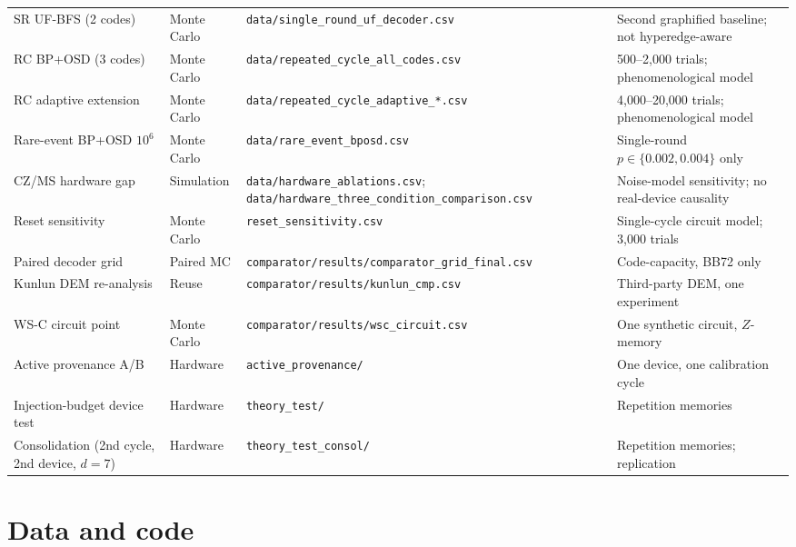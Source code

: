 \documentclass[11pt,a4paper]{article}
\begin{document}
\begin{table}[H]
\begin{tabularx}{\textwidth}{@{}p{3.1cm}p{1.7cm}X p{2.9cm}@{}}
SR UF-BFS (2 codes) & Monte Carlo & \texttt{data/single\_round\_uf\_decoder.csv} & Second graphified baseline; not hyperedge-aware \\
RC BP+OSD (3 codes) & Monte Carlo & \texttt{data/repeated\_cycle\_all\_codes.csv} & 500--2,000 trials; phenomenological model \\
RC adaptive extension & Monte Carlo & \texttt{data/repeated\_cycle\_adaptive\_*.csv} & 4,000--20,000 trials; phenomenological model \\
Rare-event BP+OSD $10^{6}$ & Monte Carlo & \texttt{data/rare\_event\_bposd.csv} & Single-round $p\in\{0.002,0.004\}$ only \\
CZ/MS hardware gap & Simulation & \texttt{data/hardware\_ablations.csv}; \texttt{data/hardware\_three\_condition\_comparison.csv} & Noise-model sensitivity; no real-device causality \\
Reset sensitivity & Monte Carlo & \texttt{reset\_sensitivity.csv} & Single-cycle circuit model; 3,000 trials \\
Paired decoder grid & Paired MC & \texttt{comparator/results/comparator\_grid\_final.csv} & Code-capacity, BB72 only \\
Kunlun DEM re-analysis & Reuse & \texttt{comparator/results/kunlun\_cmp.csv} & Third-party DEM, one experiment \\
WS-C circuit point & Monte Carlo & \texttt{comparator/results/wsc\_circuit.csv} & One synthetic circuit, $Z$-memory \\
Active provenance A/B & Hardware & \texttt{active\_provenance/} & One device, one calibration cycle \\
Injection-budget device test & Hardware & \texttt{theory\_test/} & Repetition memories \\
Consolidation (2nd cycle, 2nd device, $d{=}7$) & Hardware & \texttt{theory\_test\_consol/} & Repetition memories; replication \\
\bottomrule
\end{tabularx}
\end{table}

\section*{Data and code}
\end{document}
